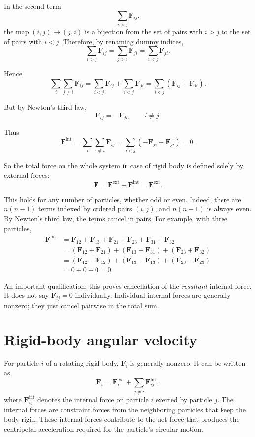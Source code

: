\documentclass[a4paper,11pt]{article}
\begin{document}
In the second term
\[
\sum_{i>j}\mathbf F_{ij}.
\]
the map $(i,j) \mapsto (j,i)$ is a bijection from the set of pairs with $i>j$ to
the set of pairs with \(i<j\). Therefore, by renaming dummy indices,
\[
\sum_{i>j}\mathbf F_{ij}
=
\sum_{j>i}\mathbf F_{ji}
=
\sum_{i<j}\mathbf F_{ji}.
\]

Hence
\[
\sum_i\sum_{j\ne i}\mathbf F_{ij}
=
\sum_{i<j}\mathbf F_{ij}
+
\sum_{i<j}\mathbf F_{ji}
=
\sum_{i<j}\left(\mathbf F_{ij}+\mathbf F_{ji}\right).
\]

But by Newton’s third law,
\[
\mathbf F_{ij}=-\mathbf F_{ji}, \qquad i\ne j.
\]

Thus
\[
\mathbf F^{\mathrm{int}}
=
\sum_i\sum_{j\ne i}\mathbf F_{ij}
=
\sum_{i<j}\left(-\mathbf F_{ji}+\mathbf F_{ji}\right)
=
0.
\]

So the total force on the whole system in case of rigid body is
defined solely by external forces:
\[
\mathbf F
=
\mathbf F^{\mathrm{ext}} + \mathbf F^{\mathrm{int}}
=
\mathbf F^{\mathrm{ext}}.
\]

This holds for any number of particles, whether odd or even. Indeed, there
are $n(n-1)$ terms indexed by ordered pairs $(i,j)$, and $n(n-1)$ is
always even. By Newton’s third law, the terms cancel in pairs.
For example, with three particles,
\[
\begin{aligned}
\mathbf F^{\mathrm{int}}
&=
 \mathbf F_{12}+\mathbf F_{13}
+\mathbf F_{21}+\mathbf F_{23}
+\mathbf F_{31}+\mathbf F_{32} \\
&=
 (\mathbf F_{12}+\mathbf F_{21})
+(\mathbf F_{13}+\mathbf F_{31})
+(\mathbf F_{23}+\mathbf F_{32}) \\
&=
 (\mathbf F_{12}-\mathbf F_{12})
+(\mathbf F_{13}-\mathbf F_{13})
+(\mathbf F_{23}-\mathbf F_{23}) \\
&=0+0+0=0.
\end{aligned}
\]

An important qualification: this proves cancellation of the \emph{resultant}
internal force.  It does not say $\mathbf F_{ij}=0$ individually.
Individual internal forces are generally nonzero; they just cancel pairwise in
the total sum.

\section{Rigid-body angular velocity}

For particle $i$ of a rotating rigid body, $\mathbf F_i$ is generally nonzero.
It can be written as
\[
\mathbf F_i
=
\mathbf F_i^{\mathrm{ext}}
+
\sum_{j\ne i}\mathbf F_{ij}^{\mathrm{int}},
\]
where $\mathbf F_{ij}^{\mathrm{int}}$ denotes the internal force on particle $i$
exerted by particle $j$. The internal forces are constraint forces from the
neighboring particles that keep the body rigid. These internal forces contribute
to the net force that produces the centripetal acceleration required for the
particle's circular motion.
\end{document}
